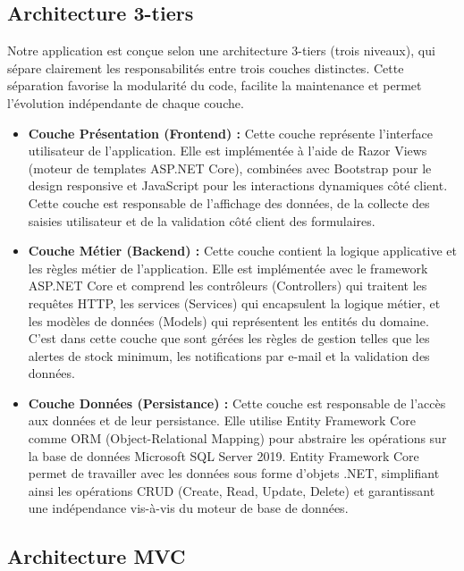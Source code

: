 \subsection{Architecture 3-tiers}

Notre application est conçue selon une architecture 3-tiers (trois niveaux), qui sépare clairement les responsabilités entre trois couches distinctes. Cette séparation favorise la modularité du code, facilite la maintenance et permet l'évolution indépendante de chaque couche.

\begin{itemize}[label=\textbullet,font=\normalsize]
    \item \textbf{Couche Présentation (Frontend) :} Cette couche représente l'interface utilisateur de l'application. Elle est implémentée à l'aide de Razor Views (moteur de templates ASP.NET Core), combinées avec Bootstrap pour le design responsive et JavaScript pour les interactions dynamiques côté client. Cette couche est responsable de l'affichage des données, de la collecte des saisies utilisateur et de la validation côté client des formulaires.
    
    \item \textbf{Couche Métier (Backend) :} Cette couche contient la logique applicative et les règles métier de l'application. Elle est implémentée avec le framework ASP.NET Core et comprend les contrôleurs (Controllers) qui traitent les requêtes HTTP, les services (Services) qui encapsulent la logique métier, et les modèles de données (Models) qui représentent les entités du domaine. C'est dans cette couche que sont gérées les règles de gestion telles que les alertes de stock minimum, les notifications par e-mail et la validation des données.
    
    \item \textbf{Couche Données (Persistance) :} Cette couche est responsable de l'accès aux données et de leur persistance. Elle utilise Entity Framework Core comme ORM (Object-Relational Mapping) pour abstraire les opérations sur la base de données Microsoft SQL Server 2019. Entity Framework Core permet de travailler avec les données sous forme d'objets .NET, simplifiant ainsi les opérations CRUD (Create, Read, Update, Delete) et garantissant une indépendance vis-à-vis du moteur de base de données.
\end{itemize}

\subsection{Architecture MVC}

